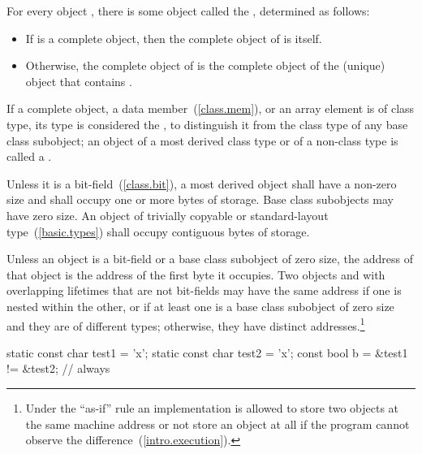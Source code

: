 \pnum
For every object , there is some object called the
 , determined as follows:

\begin{itemize}

\item
If  is a complete object, then the complete object
of  is itself.

\item
Otherwise, the complete object of  is the complete object
of the (unique) object that contains .

\end{itemize}

\pnum
If a complete object, a data member~(\ref{class.mem}), or an array element is of
class type, its type is considered the , to distinguish it from the class type of any base class subobject;
an object of a most derived class type or of a non-class type is called a
.

\pnum
{}%
Unless it is a bit-field~(\ref{class.bit}), a most derived object shall have a
non-zero size and shall occupy one or more bytes of storage. Base class
subobjects may have zero size. An object of trivially copyable or
standard-layout type~(\ref{basic.types}) shall occupy contiguous bytes of
storage.

\pnum
{}%
%
Unless an object is a bit-field or a base class subobject of zero size, the
address of that object is the address of the first byte it occupies.
Two objects  and 
with overlapping lifetimes
that are not bit-fields
may have the same address
if one is nested within the other,
or
if at least one is a base class subobject of zero size
and they are of different types;
otherwise, they have distinct addresses.\footnote{Under the ``as-if'' rule an
implementation is allowed to store two objects at the same machine address or
not store an object at all if the program cannot observe the
difference~(\ref{intro.execution}).}

\begin{example}
\begin{codeblock}
static const char test1 = 'x';
static const char test2 = 'x';
const bool b = &test1 != &test2;      // always 
\end{codeblock}
\end{example}

